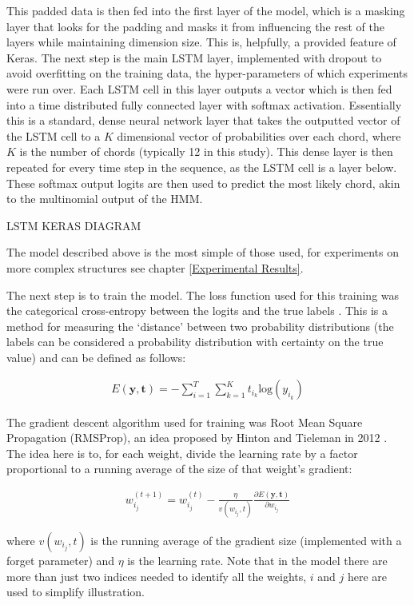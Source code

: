 \documentclass[bsc,singlespacing,logo, parskip, deptreport]{infthesis}
\begin{document}
This padded data is then fed into the first layer of the model, which is a masking layer that looks for the padding and masks it from influencing the rest of the layers while maintaining dimension size. This is, helpfully, a provided feature of Keras. The next step is the main LSTM layer, implemented with dropout to avoid overfitting on the training data, the hyper-parameters of which experiments were run over. Each LSTM cell in this layer outputs a vector which is then fed into a time distributed fully connected layer with softmax activation. Essentially this is a standard, dense neural network layer that takes the outputted vector of the LSTM cell to a $K$ dimensional vector of probabilities over each chord, where $K$ is the number of chords (typically 12 in this study). This dense layer is then repeated for every time step in the sequence, as the LSTM cell is a layer below. These softmax output logits are then used to predict the most likely chord, akin to the multinomial output of the HMM.

LSTM KERAS DIAGRAM

The model described above is the most simple of those used, for experiments on more complex structures see chapter \ref{Experimental Results}.

The next step is to train the model. The loss function used for this training was the categorical cross-entropy between the logits and the true labels \cite{shore1980axiomatic}. This is a method for measuring the `distance' between two probability distributions (the labels can be considered a probability distribution with certainty on the true value) and can be defined as follows:

\begin{align}
  E(\bm{y}, \bm{t}) = - \sum_{i=1}^{T}\sum_{k=1}^{K} t_{i_k} \mathrm{log}(y_{i_k})
\end{align}

The gradient descent algorithm used for training was Root Mean Square Propagation (RMSProp), an idea proposed by Hinton and Tieleman in 2012 \cite{tieleman2012lecture}. The idea here is to, for each weight, divide the learning rate by a factor proportional to a running average of the size of that weight's gradient:

\begin{align}
  w_{i_j}^{(t+1)} = w_{i_j}^{(t)} - \frac{\eta}{v(w_{i_j}, t)} \frac{\partial E(\bm{y}, \bm{t})}{\partial w_{i_j}}
\end{align}

where $v(w_{i_j}, t)$ is the running average of the gradient size (implemented with a forget parameter) and $\eta$ is the learning rate. Note that in the model there are more than just two indices needed to identify all the weights, $i$ and $j$ here are used to simplify illustration.
\end{document}
